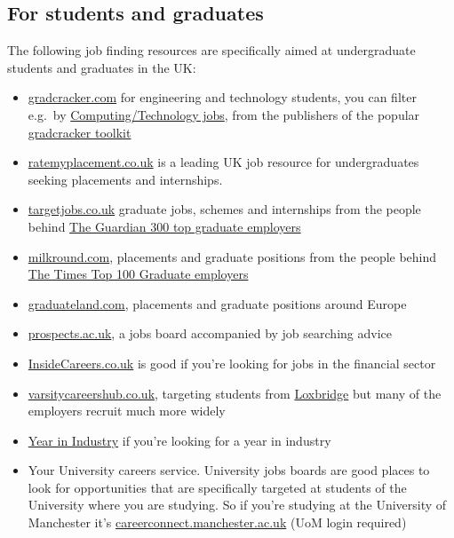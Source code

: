 \documentclass[
]{book}
\providecommand{\tightlist}{%
  \setlength{\itemsep}{0pt}\setlength{\parskip}{0pt}}
\begin{document}
\hypertarget{studentjobs}{%
\subsection{For students and graduates}\label{studentjobs}}

The following job finding resources are specifically aimed at undergraduate students and graduates in the UK:

\begin{itemize}
\tightlist
\item
  \href{http://www.gradcracker.com/}{gradcracker.com} for engineering and technology students, you can filter e.g.~by \href{https://www.gradcracker.com/search/computing-technology/jobs}{Computing/Technology jobs}, from the publishers of the popular \href{http://www.gradcracker.com/career-centre/toolkit}{gradcracker toolkit}
\item
  \href{http://www.ratemyplacement.co.uk/}{ratemyplacement.co.uk} is a leading UK job resource for undergraduates seeking placements and internships.
\item
  \href{http://www.targetjobs.co.uk/}{targetjobs.co.uk} graduate jobs, schemes and internships from the people behind \href{https://targetjobs.co.uk/uk300}{The Guardian 300 top graduate employers}
\item
  \href{http://www.milkround.com/}{milkround.com}, placements and graduate positions from the people behind \href{https://digital.top100graduateemployers.com/view/979434180/}{The Times Top 100 Graduate employers}
\item
  \href{https://graduateland.com/}{graduateland.com}, placements and graduate positions around Europe
\item
  \href{https://www.prospects.ac.uk/}{prospects.ac.uk}, a jobs board accompanied by job searching advice
\item
  \href{https://www.insidecareers.co.uk}{InsideCareers.co.uk} is good if you're looking for jobs in the financial sector
\item
  \href{https://www.varsitycareershub.co.uk/}{varsitycareershub.co.uk}, targeting students from \href{https://en.wikipedia.org/wiki/Loxbridge}{Loxbridge} but many of the employers recruit much more widely
\item
  \href{https://www.etrust.org.uk/yini-vacancies}{Year in Industry} if you're looking for a year in industry
\item
  Your University careers service. University jobs boards are good places to look for opportunities that are specifically targeted at students of the University where you are studying. So if you're studying at the University of Manchester it's \href{https://careerconnect.manchester.ac.uk/user/jobs.html}{careerconnect.manchester.ac.uk} (UoM login required)
\end{itemize}
\end{document}
